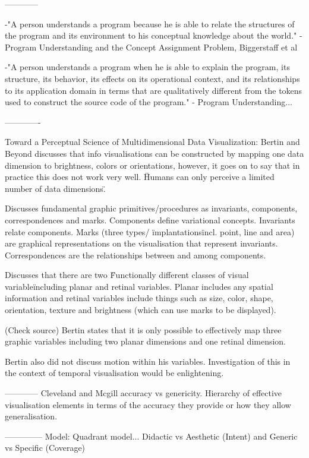 ------------

-"A person understands a program because he is able to relate the structures of the program and its environment to his conceptual knowledge about the world." - Program Understanding and the Concept Assignment Problem, Biggerstaff et al

-"A person understands a program when he is able to explain the program, its structure, its behavior, its effects on its operational context, and its relationships to its application domain in terms that are qualitatively different from the tokens used to construct the source code of the program." - Program Understanding...

-------------

Toward a Perceptual Science of Multidimensional Data Visualization: Bertin and Beyond discusses that info visualisations can be constructed by mapping one data dimension to brightness, colors or orientations, however, it goes on to say that in practice this does not work very well. \"Humans can only perceive a limited number of data dimensions\".

Discusses fundamental graphic primitives/procedures as invariants, components, correspondences and marks. Components define variational concepts. Invariants relate components. Marks (three types/ \"implantations\" incl. point, line and area) are graphical representations on the visualisation that represent invariants. Correspondences are the relationships between and among components.

Discusses that there are two \"Functionally different classes of visual variable\" including planar and retinal variables. Planar includes any spatial information and retinal variables include things such as size, color, shape, orientation, texture and brightness (which can use marks to be displayed).

(Check source) Bertin states that it is only possible to effectively map three graphic variables including two planar dimensions and one retinal dimension.

Bertin also did not discuss motion within his variables. Investigation of this in the context of temporal visualisation would be enlightening.

------------
Cleveland and Mcgill accuracy vs genericity. Hierarchy of effective visualisation elements in terms of the accuracy they provide or how they allow generalisation.

--------------
Model:
Quadrant model...
Didactic vs Aesthetic (Intent) and Generic vs Specific (Coverage)


